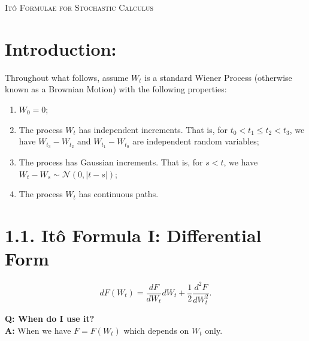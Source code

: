 \documentclass[11pt]{article}
\begin{document}

\begin{tcolorbox}
\begin{center}
    \large
    \textsc{Itô Formulae for Stochastic Calculus} 
\end{center}
\end{tcolorbox}


\section*{Introduction:}
Throughout what follows, assume $W_t$ is a standard Wiener Process (otherwise known as a Brownian Motion) with the following properties:

\begin{enumerate}
    \item $W_0 = 0$;
    \item The process $W_t$ has independent increments. That is, for $ t_0 < t_1 \leq t_2 < t_3$, we have $W_{t_3} - W_{t_2}$ and $W_{t_1} - W_{t_0}$ are independent random variables;
    \item The process has Gaussian increments. That is, for $s < t$, we have $W_t - W_s \sim \mathcal{N}(0,|t-s|)$;
    \item The process $W_t$ has continuous paths. 
\end{enumerate}

\vspace{0.5cm}


\section*{1.1. Itô Formula I: Differential Form}

\begin{equation}
    dF(W_t) = \frac{dF}{dW_t} dW_t + \frac{1}{2} \frac{d^2 F}{dW_t^{2}}.
\end{equation}

\textbf{Q: When do I use it?} \\
\textbf{A:} When we have $F = F(W_t)$ which depends on $W_t$ only. 
\end{document}
